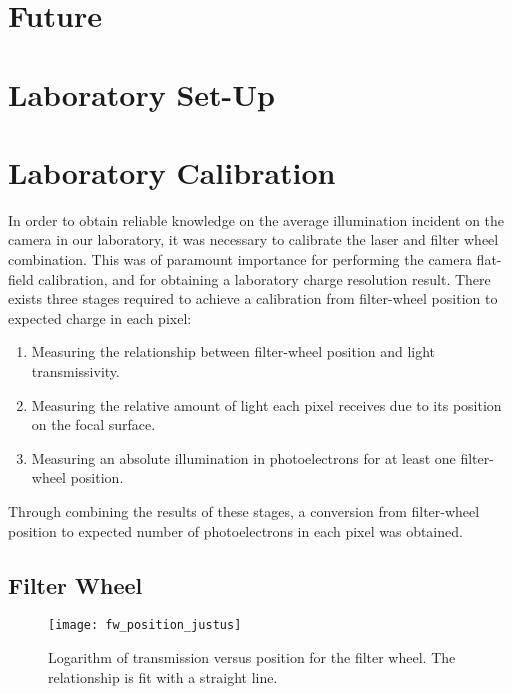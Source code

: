 \section{Future}

\section{Laboratory Set-Up}

\section{Laboratory Calibration} \label{section:lab-calib}

In order to obtain reliable knowledge on the average illumination incident on the camera in our laboratory, it was necessary to calibrate the laser and filter wheel combination. This was of paramount importance for performing the camera flat-field calibration, and for obtaining a laboratory charge resolution result. There exists three stages required to achieve a calibration from filter-wheel position to expected charge in each pixel:
\begin{enumerate}
\item Measuring the relationship between filter-wheel position and light transmissivity.
\item Measuring the relative amount of light each pixel receives due to its position on the focal surface.
\item Measuring an absolute illumination in photoelectrons for at least one filter-wheel position.
\end{enumerate}
Through combining the results of these stages, a conversion from filter-wheel position to expected number of photoelectrons in each pixel was obtained.

\subsection{Filter Wheel}

\begin{figure}
	\centering
    \texttt{[image: fw\_position\_justus]} 
	\caption[Filter-wheel Position Calibration]{Logarithm of transmission versus position for the filter wheel. The relationship is fit with a straight line.}
	\label{fig:fw_position}
\end{figure}

